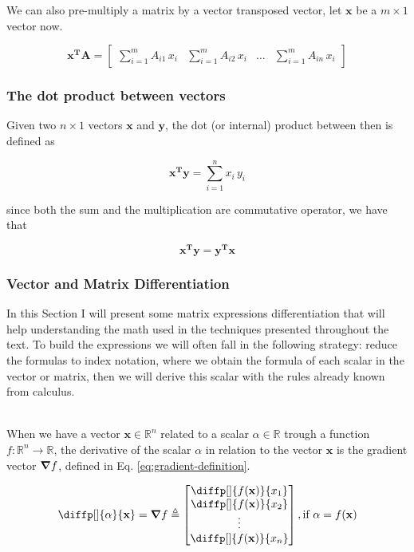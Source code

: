 \documentclass[12pt]{article}
\newcommand{\bvec}[1]{\mathbf{#1}} %
\newcommand{\bvecT}[1]{\mathbf{#1^T}} %
\newcommand{\mat}[1]{\mathbf{#1}}
\newcommand{\Sum}[3][i]{\sum\limits_{#1 = #2}^{#3}}
\newcommand{\R}{\mathbb{R}}
\newcommand{\hsix}[1]{\noindent{\normalsize \textbf{#1}}}
\begin{document}
We can also pre-multiply a matrix by a vector transposed vector, let $\bvec{x}$ be a $m\times 1$ vector now.

\begin{equation}
    \bvecT{x} \mat{A} = \begin{bmatrix}
        \sum\limits_{i = 1}^{m} A_{i1} \, x_i &
        \sum\limits_{i = 1}^{m} A_{i2} \, x_i & \dots &
        \sum\limits_{i = 1}^{m} A_{in} \, x_i
    \end{bmatrix}
    \label{eq:vector-matrix-multiplication}
\end{equation}

\subsubsection{The dot product between vectors}
Given two $n\times 1$ vectors $\bvec{x}$ and $\bvec{y}$, the dot (or internal) product between then is defined as

\begin{equation}
    \bvecT{x}\bvec{y} = \Sum{1}{n} x_i\,y_i
    \label{eq:dot-product}
\end{equation}

since both the sum and the multiplication are commutative operator, we have that

\begin{equation}
    \bvecT{x}\bvec{y} = \bvecT{y}\bvec{x}
\end{equation}
\subsubsection{Vector and Matrix Differentiation}
In this Section I will present some matrix expressions differentiation that will help understanding the math used in the techniques presented throughout the text. To build the expressions we will often fall in the following strategy: reduce the formulas to index notation, where we obtain the formula of each scalar in the vector or matrix, then we will derive this scalar with the rules already known from calculus.

\hsix{The Gradient Vector}\\
When we have a vector $\bvec{x} \in \R^n$ related to a scalar $\alpha \in \R$ trough a function $f: \R^n \to \R$, the derivative of the scalar $\alpha$ in relation to the vector $\bvec{x}$ is the gradient vector $\grad{f}$, defined in Eq. \ref{eq:gradient-definition}.

\renewcommand{\arraystretch}{1.5}
\begin{equation}
    \diffp[]{\alpha}{\bvec{x}} = \grad{f} \triangleq \begin{bmatrix}
        \diffp[]{f(\bvec{x})}{x_1} \\
        \diffp[]{f(\bvec{x})}{x_2} \\
        \vdots \\
        \diffp[]{f(\bvec{x})}{x_n} \\
    \end{bmatrix}, \text{if $\alpha = f(\bvec{x})$}
    \label{eq:gradient-definition}
\end{equation}
\renewcommand{\arraystretch}{1.0}
\end{document}
